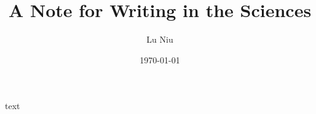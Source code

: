 \documentclass[b5paper,12pt]{article}
\title{\textbf{A Note for Writing in the Sciences}}
\author{Lu Niu}
\date{\today}
\begin{document}
\maketitle

text
\end{document}
